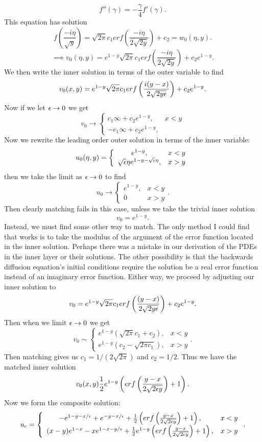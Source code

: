         $$f''(\gamma)=-\frac{\gamma}{4}f'(\gamma).$$
        This equation has solution
        $$f\left(\frac{-i\eta}{\sqrt{y}}\right)=\sqrt{2\pi}c_1 erf\left(\frac{-i\eta}{2\sqrt{2 y}}\right)+c_2=w_0(\eta,y).$$
        $$\implies v_0(\eta,y)=e^{1-y}\sqrt{2\pi}c_1 erf\left(\frac{-i\eta}{2\sqrt{2 y}}\right)+c_2e^{1-y}.$$
        We then write the inner solution in terms of the outer variable to find
        $$v_0(x,y)=e^{1-y}\sqrt{2\pi}c_1 erf\left(\frac{i(y-x)}{2\sqrt{2y \epsilon}}\right)+c_2 e^{1-y}.$$
        Now if we let $\epsilon\to 0$ we get
        $$v_0\to \left\{\begin{array}{cc}c_1 \infty +c_2 e^{1-y},&x<y\\ -c_1 \infty +c_2 e^{1-y}, &\end{array}\right.$$
        Now we rewrite the leading order outer solution in terms of the inner variable:
        $$u_0(\eta,y)=\left\{\begin{array}{cc}e^{1-y},&x<y\\ \sqrt{\epsilon}\eta e^{1-y-\sqrt{\epsilon}\eta},&x>y\end{array}\right.$$
        then we take the limit as $\epsilon\to 0$ to find
        $$u_0\to\left\{\begin{array}{cc}e^{1-y},&x<y\\0&x>y\end{array}\right..$$
        Then clearly matching fails in this case, unless we take the trivial inner solution
        $$v_0=e^{1-y}.$$
        Instead, we must find some other way to match. The only method I could find that works is to take the modulus of the argument of the error function located in the inner solution. Perhaps there was a mistake in our derivation of the PDEs in the inner layer or their solutions. The other possibility is that the backwards diffusion equation's initial conditions require the solution be a real error function instead of an imaginary error function. Either way, we proceed by adjusting our inner solution to
        $$v_0=e^{1-y}\sqrt{2\pi}c_1 erf\left(\frac{(y-x)}{2\sqrt{2y \epsilon}}\right)+c_2 e^{1-y}.$$
        Then when we limit $\epsilon\to 0$ we get
        $$v_0\sim \left\{\begin{array}{cc}e^{1-y}(\sqrt{2\pi}c_1+c_2),&x<y\\ e^{1-y}(c_2-\sqrt{2\pi c_1}), &x>y\end{array}\right..$$
        Then matching gives us $c_1=1/(2\sqrt{2\pi})$ and $c_2=1/2$. Thus we have the matched inner solution
        $$v_0(x,y)\frac{1}{2}e^{1-y}\left(erf\left(\frac{y-x}{2\sqrt{2\epsilon y}}\right)+1\right).$$
        Now we form the composite solution:
        $$u_c=\left\{\begin{array}{cc}-e^{1-y-x/\epsilon}+e^{-y-x/\epsilon}+\frac{1}{2}\left(erf\left(\frac{y-x}{2\sqrt{2\epsilon y}}\right)+1\right),&x<y\\ (x-y)e^{1-x}-xe^{1-x-y/\epsilon}+\frac{1}{2}e^{1-y}\left(erf\left(\frac{y-x}{2\sqrt{2\epsilon y}}\right)+1\right),&x>y\end{array}\right..$$
        \eenum
\eenum

